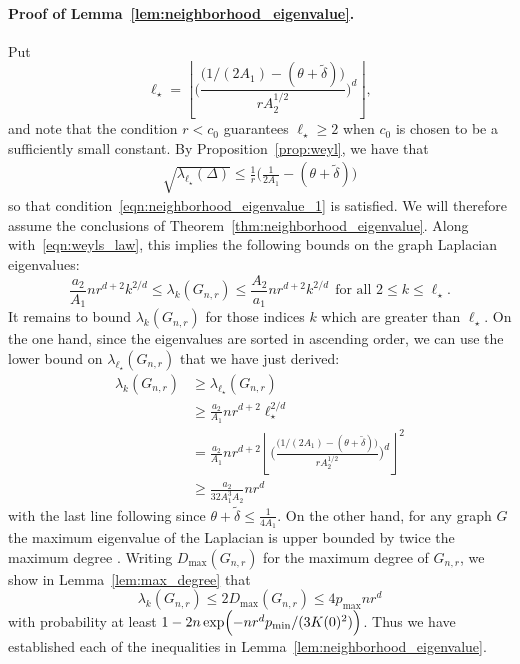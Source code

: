 \documentclass[twoside]{article}
\newcommand{\floor}[1]{\left\lfloor #1 \right\rfloor}
\newcommand{\1}{\mathbf{1}}
\newcommand{\wt}[1]{\widetilde{#1}}
\theoremstyle{definition}
\theoremstyle{remark}
\begin{document}
\paragraph{Proof of Lemma~\ref{lem:neighborhood_eigenvalue}.}
Put
\begin{equation*}
\ell_{\star} = \floor{\biggl(\frac{\bigl(1/(2A_1) - (\theta + \wt{\delta})\bigr)}{rA_2^{1/2}}\biggr)^d},
\end{equation*}
and note that the condition $r < c_0$ guarantees $\ell_{\star} \geq 2$ when $c_0$ is chosen to be a sufficiently small constant. By Proposition~\ref{prop:weyl}, we have that
\begin{align*}
\sqrt{\lambda_{\ell_{\star}}(\Delta)} \leq \frac{1}{r}\biggl(\frac{1}{2A_1} - (\theta + \wt{\delta})\biggr) 
\end{align*}
so that condition~\eqref{eqn:neighborhood_eigenvalue_1} is satisfied. We will therefore assume the conclusions of Theorem~\ref{thm:neighborhood_eigenvalue}. Along with~\eqref{eqn:weyls_law}, this implies the following bounds on the graph Laplacian eigenvalues:
\begin{equation*}
\frac{a_2}{A_1} nr^{d + 2} k^{2/d} \leq \lambda_k(G_{n,r}) \leq \frac{A_2}{a_1} nr^{d + 2} k^{2/d}~~\textrm{for all $2 \leq k \leq \ell_{\star}$}.
\end{equation*}
It remains to bound $\lambda_k(G_{n,r})$ for those indices $k$ which are greater than $\ell_{\star}$. On the one hand, since the eigenvalues are sorted in ascending order, we can use the lower bound on $\lambda_{\ell_{\star}}(G_{n,r})$ that we have just derived:
\begin{align*}
\lambda_k(G_{n,r}) & \geq \lambda_{\ell_{\star}}(G_{n,r}) \\
& \geq \frac{a_2}{A_1}nr^{d + 2}\ell_{\star}^{2/d} \\
& = \frac{a_2}{A_1}nr^{d + 2} \floor{\biggl(\frac{\bigl(1/(2A_1) - (\theta + \wt{\delta})\bigr)}{rA_2^{1/2}}\biggr)^d}^2 \\
& \geq \frac{a_2}{32A_1^3 A_2} nr^{d}
\end{align*}
with the last line following since $\theta + \wt{\delta} \leq \frac{1}{4A_1}$. On the other hand, for any graph $G$ the maximum eigenvalue of the Laplacian is upper bounded by twice the maximum degree \citep{chung97}. Writing $D_{\max}(G_{n,r})$ for the maximum degree of $G_{n,r}$, we show in Lemma~\ref{lem:max_degree} that
\begin{equation*}
\lambda_k(G_{n,r}) \leq 2D_{\max}(G_{n,r}) \leq 4p_{\max}nr^d 
\end{equation*}
with probability at least $1 - 2n\exp\Bigl(-nr^dp_{\min}/(3K(0)^2)\Bigr)$. Thus we have established each of the inequalities in Lemma~\ref{lem:neighborhood_eigenvalue}.
\end{document}
